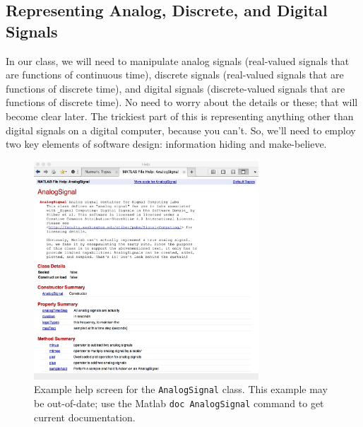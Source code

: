\subsection{Representing Analog, Discrete, and Digital Signals}

In our class, we will need to manipulate analog signals (real-valued
signals that are functions of continuous time), discrete signals
(real-valued signals that are functions of discrete time), and digital
signals (discrete-valued signals that are functions of discrete
time). No need to worry about the details or these; that will become
clear later. The trickiest part of this is representing anything other
than digital signals on a digital computer, because you can't. So,
we'll need to employ two key elements of software design: information
hiding and make-believe.

\begin{figure}
\begin{center}
\includegraphics[width=0.75\textwidth]{lab1/AnalogSignal-help}
\end{center}
\caption{Example help screen for the \texttt{AnalogSignal}
  class. This example may be out-of-date; use the Matlab
  \texttt{doc AnalogSignal} command to get current
  documentation.\label{fg:analogsignal-help}}
\end{figure}

